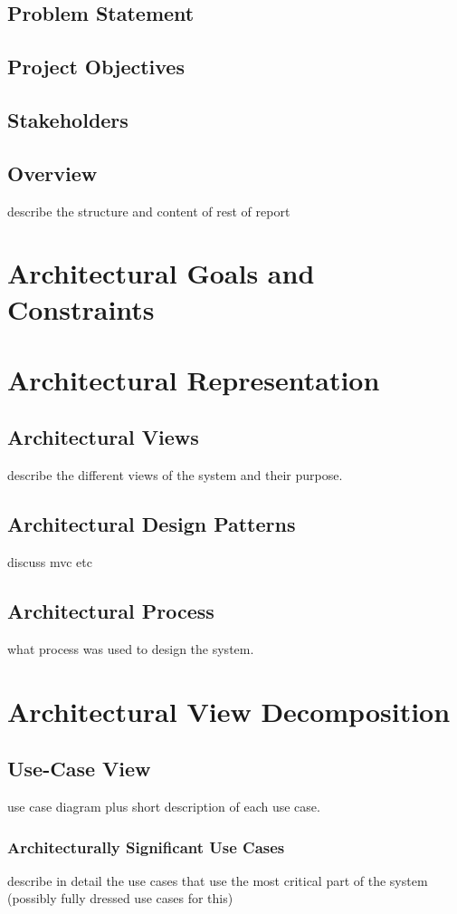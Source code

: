 \documentclass[11pt]{article}
\begin{document}
\subsection{Problem Statement}
\subsection{Project Objectives}
\subsection{Stakeholders}
\subsection{Overview}
describe the structure and content of rest of report
\section{Architectural Goals and Constraints}


\section{Architectural Representation}
\subsection{Architectural Views}
describe the different views of the system and their purpose.
\subsection{Architectural Design Patterns}
discuss mvc etc
\subsection{Architectural Process}
what process was used to design the system.
\section{Architectural View Decomposition}
\subsection{Use-Case View}
use case diagram plus short description of each use case.
\subsubsection{Architecturally Significant Use Cases}
describe in detail the use cases that use the most critical part of the system (possibly fully dressed use cases for this)
\end{document}
